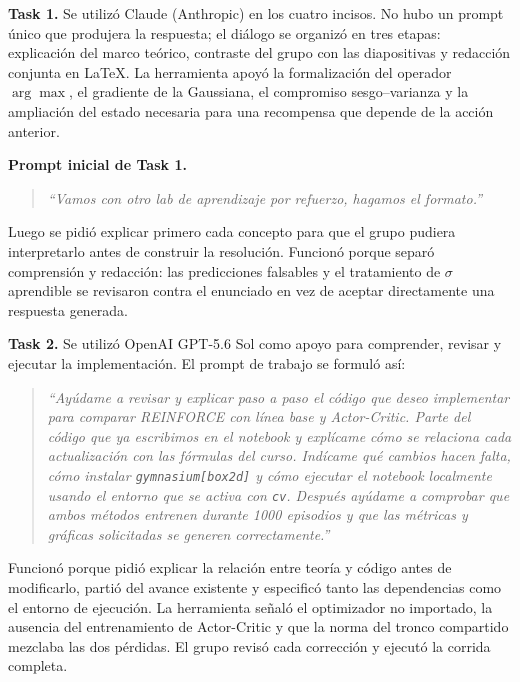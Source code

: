 \documentclass[11pt,letterpaper]{article}
\newcommand{\lead}[1]{\textbf{#1}}
\begin{document}
\begin{respuesta}
\lead{Task 1.} Se utilizó Claude (Anthropic) en los cuatro incisos. No hubo un prompt
único que produjera la respuesta; el diálogo se organizó en tres etapas: explicación del
marco teórico, contraste del grupo con las diapositivas y redacción conjunta en
\LaTeX{}. La herramienta apoyó la formalización del operador $\arg\max$, el gradiente
de la Gaussiana, el compromiso sesgo--varianza y la ampliación del estado necesaria para
una recompensa que depende de la acción anterior.

\medskip
\lead{Prompt inicial de Task 1.}
\begin{quote}\itshape
``Vamos con otro lab de aprendizaje por refuerzo, hagamos el formato.''
\end{quote}
Luego se pidió explicar primero cada concepto para que el grupo pudiera interpretarlo
antes de construir la resolución. Funcionó porque separó comprensión y redacción: las
predicciones falsables y el tratamiento de $\sigma$ aprendible se revisaron contra el
enunciado en vez de aceptar directamente una respuesta generada.

\medskip
\lead{Task 2.} Se utilizó OpenAI GPT-5.6 Sol como apoyo para comprender, revisar y
ejecutar la implementación. El prompt de trabajo se formuló así:
\begin{quote}\itshape
``Ayúdame a revisar y explicar paso a paso el código que deseo implementar para comparar
REINFORCE con línea base y Actor-Critic. Parte del código que ya escribimos en el
notebook y explícame cómo se relaciona cada actualización con las fórmulas del curso.
Indícame qué cambios hacen falta, cómo instalar \texttt{gymnasium[box2d]} y cómo ejecutar
el notebook localmente usando el entorno que se activa con \texttt{cv}. Después ayúdame
a comprobar que ambos métodos entrenen durante 1000 episodios y que las métricas y
gráficas solicitadas se generen correctamente.''
\end{quote}
Funcionó porque pidió explicar la relación entre teoría y código antes de modificarlo,
partió del avance existente y especificó tanto las dependencias como el entorno de
ejecución. La herramienta señaló el optimizador no importado, la ausencia del
entrenamiento de Actor-Critic y que la norma del tronco compartido mezclaba las dos
pérdidas. El grupo revisó cada corrección y ejecutó la corrida completa.


\end{respuesta}
\end{document}
